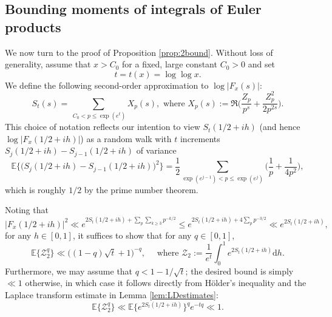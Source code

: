 \documentclass{amsart}
\theoremstyle{definition}
\theoremstyle{remark}
\numberwithin{equation}{section}
\begin{document}
\subsection{Bounding moments of integrals of Euler products}\label{sec:restrictedeuler} 

We now turn to the proof of Proposition \ref{prop:2bound}. Without loss of generality, assume that $x>C_0$ for a fixed, large constant $C_0>0$ and set
\[
    t=t(x)=\log\log x.
\]
 We define the following second-order approximation to $\log|F_x(s)|$:
\begin{equation}\label{eq:walk}
    S_t(s)=\sum_{\
     C_0<p\leq \exp(e^t)} X_p(s),\text{ where } X_p(s):= \Re\bigg(\frac{Z_p}{p^{s}}+\frac{Z_p^2}{2p^{2s}}\bigg).
\end{equation}
This choice of notation reflects our intention to view $S_t(1/2+ih)$ (and hence $\log |F_x(1/2+ih)|$) as a random walk with $t$ increments $S_{j}(1/2+ih)-S_{j-1}(1/2+ih)$ of variance
\[
   \mathbb{E}\Big\{\big(S_{j}(1/2+ih)-S_{j-1}(1/2+ih)\big)^2\Big\}= \frac{1}{2}\sum_{\exp(e^{j-1})<p\leq \exp(e^j)} \Big(\frac{1}{p}+\frac{1}{4p^2}\Big),
\]
which is roughly $1/2$ by the prime number theorem. 

Noting that
\begin{equation}\label{eq:trimming}
        {|F_{x}(1/2+ih)|^2}\ll e^{2S_{t}(1/2+ih)+\sum_{p}\sum_{k\geq 3}p^{-k/2}} \leq e^{2S_t(1/2+ih)+4\sum_p p^{-3/2}} \ll e^{2S_t(1/2+ih)},
\end{equation}
for any $h\in [0,1]$,
it suffices to show that for any $q\in [0,1]$,
\begin{equation}\label{eq:helsonmoment}
    \mathbb{E}\big\{\mathcal{Z}_2^q\big\}\ll \big((1-q)\sqrt{t}+1\big)^{-q},\quad \text{ where } \mathcal{Z}_{2}:= \frac{1}{e^t}\int_0^1 e^{2 S_t(1/2+ih)}\mathrm{d}h.
\end{equation}
Furthermore, we may assume that $q<1-1/\sqrt{t}$; the desired bound is simply $\ll 1$ otherwise, in which case it follows directly from  Hölder's inequality and the Laplace transform estimate in Lemma \ref{lem:LDestimates}:
\begin{equation}\label{eq:trivialcritical}
    \mathbb{E}\big\{\mathcal{Z}_2^q\big\} \ll {\mathbb{E}\big\{e^{2S_t(1/2+ih)}\big\}^q} e^{-tq}\ll 1.
\end{equation}

\bigskip 
\end{document}

